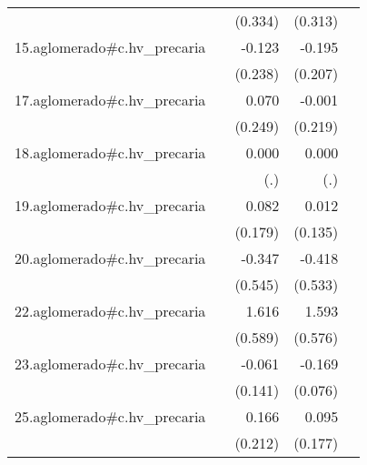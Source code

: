 {\begin{longtable}{l*{4}{D{.}{.}{-1}}}
            &                     &     (0.334)         &     (0.313)         &                     \\
\addlinespace
15.aglomerado#c.hv\_precaria&                     &      -0.123         &      -0.195         &                     \\
            &                     &     (0.238)         &     (0.207)         &                     \\
\addlinespace
17.aglomerado#c.hv\_precaria&                     &       0.070         &      -0.001         &                     \\
            &                     &     (0.249)         &     (0.219)         &                     \\
\addlinespace
18.aglomerado#c.hv\_precaria&                     &       0.000         &       0.000         &                     \\
            &                     &         (.)         &         (.)         &                     \\
\addlinespace
19.aglomerado#c.hv\_precaria&                     &       0.082         &       0.012         &                     \\
            &                     &     (0.179)         &     (0.135)         &                     \\
\addlinespace
20.aglomerado#c.hv\_precaria&                     &      -0.347         &      -0.418         &                     \\
            &                     &     (0.545)         &     (0.533)         &                     \\
\addlinespace
22.aglomerado#c.hv\_precaria&                     &       1.616\sym{**} &       1.593\sym{**} &                     \\
            &                     &     (0.589)         &     (0.576)         &                     \\
\addlinespace
23.aglomerado#c.hv\_precaria&                     &      -0.061         &      -0.169\sym{*}  &                     \\
            &                     &     (0.141)         &     (0.076)         &                     \\
\addlinespace
25.aglomerado#c.hv\_precaria&                     &       0.166         &       0.095         &                     \\
            &                     &     (0.212)         &     (0.177)         &                     \\

\end{longtable}}
